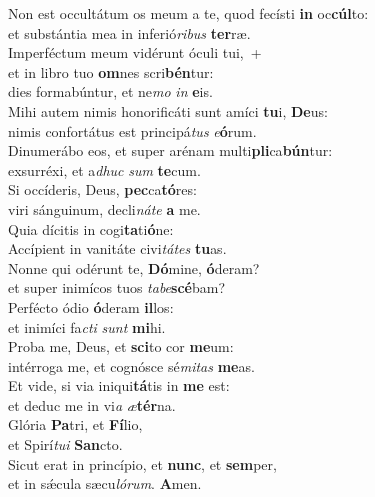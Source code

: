 \evenverse Non est occultátum os meum a te, quod fecísti \textbf{in} oc\textbf{cúl}to:~\*\\
\evenverse et substántia mea in inferió\textit{ri}\textit{bus} \textbf{ter}ræ.\\
\oddverse Imperféctum meum vidérunt óculi tui,~+\\
\oddverse  et in libro tuo \textbf{om}nes scri\textbf{bén}tur:~\*\\
\oddverse dies formabúntur, et ne\textit{mo} \textit{in} \textbf{e}is.\\
\evenverse Mihi autem nimis honorificáti sunt amíci \textbf{tu}i, \textbf{De}us:~\*\\
\evenverse nimis confortátus est principá\textit{tus} \textit{e}\textbf{ó}rum.\\
\oddverse Dinumerábo eos, et super arénam multi\textbf{pli}ca\textbf{bún}tur:~\*\\
\oddverse exsurréxi, et a\textit{dhuc} \textit{sum} \textbf{te}cum.\\
\evenverse Si occíderis, Deus, \textbf{pec}ca\textbf{tó}res:~\*\\
\evenverse viri sánguinum, decli\textit{ná}\textit{te} \textbf{a} me.\\
\oddverse Quia dícitis in cogi\textbf{ta}ti\textbf{ó}ne:~\*\\
\oddverse Accípient in vanitáte civi\textit{tá}\textit{tes} \textbf{tu}as.\\
\evenverse Nonne qui odérunt te, \textbf{Dó}mine, \textbf{ó}deram?~\*\\
\evenverse et super inimícos tuos \textit{ta}\textit{be}\textbf{scé}bam?\\
\oddverse Perfécto ódio \textbf{ó}deram \textbf{il}los:~\*\\
\oddverse et inimíci fa\textit{cti} \textit{sunt} \textbf{mi}hi.\\
\evenverse Proba me, Deus, et \textbf{sci}to cor \textbf{me}um:~\*\\
\evenverse intérroga me, et cognósce sé\textit{mi}\textit{tas} \textbf{me}as.\\
\oddverse Et vide, si via iniqui\textbf{tá}tis in \textbf{me} est:~\*\\
\oddverse et deduc me in vi\textit{a} \textit{æ}\textbf{tér}na.\\
\evenverse Glória \textbf{Pa}tri, et \textbf{Fí}lio,~\*\\
\evenverse et Spirí\textit{tu}\textit{i} \textbf{San}cto.\\
\oddverse Sicut erat in princípio, et \textbf{nunc}, et \textbf{sem}per,~\*\\
\oddverse et in sǽcula sæcu\textit{ló}\textit{rum}. \textbf{A}men.\\
